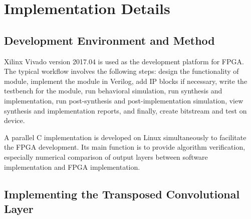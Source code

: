 
\chapter{Implementation Details}

\section{Development Environment and Method}

Xilinx Vivado version 2017.04 is used as the development platform for FPGA. The typical workflow involves
the following steps: design the functionality of module, implement the module in Verilog, add IP blocks
if necessary, write the testbench for the module, run behavioral simulation, run synthesis and implementation,
run post-synthesis and post-implementation simulation, view synthesis and implementation reports, and finally,
create bitstream and test on device.

A parallel C implementation is developed on Linux simultaneously to facilitate the FPGA development.
Its main function is to provide algorithm verification, especially numerical comparison of output layers
between software implementation and FPGA implementation.

\section{Implementing the Transposed Convolutional Layer}



\clearpage %

